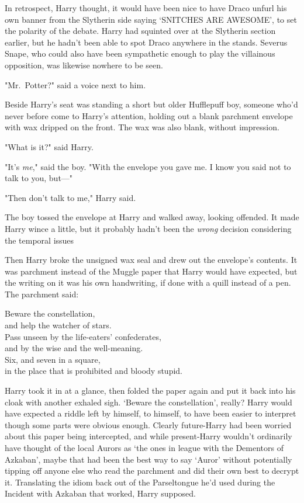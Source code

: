 In retrospect, Harry thought, it would have been nice to have Draco unfurl his
own banner from the Slytherin side saying `SNITCHES ARE AWESOME', to set the
polarity of the debate. Harry had squinted over at the Slytherin section
earlier, but he hadn't been able to spot Draco anywhere in the stands. Severus
Snape, who could also have been sympathetic enough to play the villainous
opposition, was likewise nowhere to be seen.

"Mr.~Potter?" said a voice next to him.

Beside Harry's seat was standing a short but older Hufflepuff boy, someone
who'd never before come to Harry's attention, holding out a blank parchment
envelope with wax dripped on the front. The wax was also blank, without
impression.

"What is it?" said Harry.

"It's \emph{me}," said the boy. "With the envelope you gave me. I know you said
not to talk to you, but—"

"Then don't talk to me," Harry said.

The boy tossed the envelope at Harry and walked away, looking offended. It made
Harry wince a little, but it probably hadn't been the \emph{wrong} decision
considering the temporal issues{\el}

Then Harry broke the unsigned wax seal and drew out the envelope's contents. It
was parchment instead of the Muggle paper that Harry would have expected, but
the writing on it was his own handwriting, if done with a quill instead of a
pen. The parchment said:

\begin{writtenNote}
Beware the constellation,\\
and help the watcher of stars.\\
Pass unseen by the life-eaters' confederates,\\
and by the wise and the well-meaning.\\
Six, and seven in a square,\\
in the place that is prohibited and bloody stupid.
\end{writtenNote}

Harry took it in at a glance, then folded the paper again and put it back into
his cloak with another exhaled sigh. `Beware the constellation', really? Harry
would have expected a riddle left by himself, to himself, to have been easier
to interpret{\el} though some parts were obvious enough. Clearly
future-Harry had been worried about this paper being intercepted, and while
present-Harry wouldn't ordinarily have thought of the local Aurors as `the ones
in league with the Dementors of Azkaban', maybe that had been the best way to
say `Auror' without potentially tipping off anyone else who read the parchment
and did their own best to decrypt it. Translating the idiom back out of the
Parseltongue he'd used during the Incident with Azkaban{\el} that worked,
Harry supposed.

